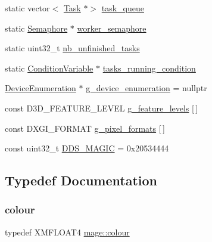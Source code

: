 \begin{DoxyCompactItemize}
\item 
static vector$<$ \hyperlink{classmage_1_1_task}{Task} $\ast$$>$ \hyperlink{namespacemage_a487c0bb81ed56ce18cd944e958961cdf}{task\+\_\+queue}
\item 
static \hyperlink{classmage_1_1_semaphore}{Semaphore} $\ast$ \hyperlink{namespacemage_a17c3448f9fba7521d188d30bdfb77e33}{worker\+\_\+semaphore}
\item 
static uint32\+\_\+t \hyperlink{namespacemage_a390e8652d67667609daf3aa64e3c00a8}{nb\+\_\+unfinished\+\_\+tasks}
\item 
static \hyperlink{classmage_1_1_condition_variable}{Condition\+Variable} $\ast$ \hyperlink{namespacemage_a8c04b4285ebbc0fb416b1905c01cf149}{tasks\+\_\+running\+\_\+condition}
\item 
\hyperlink{classmage_1_1_device_enumeration}{Device\+Enumeration} $\ast$ \hyperlink{namespacemage_a73e54b9b368875ed0281ced59e2fca7e}{g\+\_\+device\+\_\+enumeration} = nullptr
\item 
const D3\+D\+\_\+\+F\+E\+A\+T\+U\+R\+E\+\_\+\+L\+E\+V\+EL \hyperlink{namespacemage_add3b7e051df553262371e077d9d66fd9}{g\+\_\+feature\+\_\+levels} \mbox{[}$\,$\mbox{]}
\item 
const D\+X\+G\+I\+\_\+\+F\+O\+R\+M\+AT \hyperlink{namespacemage_a5a4e11b65061c618b85826ab6df480e0}{g\+\_\+pixel\+\_\+formats} \mbox{[}$\,$\mbox{]}
\item 
const uint32\+\_\+t \hyperlink{namespacemage_a52f784e41b51fee843891c6b5e9be479}{D\+D\+S\+\_\+\+M\+A\+G\+IC} = 0x20534444
\end{DoxyCompactItemize}


\subsection{Typedef Documentation}
\hypertarget{namespacemage_a2d4dece8fe175b32167f9a7b925adc7c}{}\label{namespacemage_a2d4dece8fe175b32167f9a7b925adc7c} 
\subsubsection{\texorpdfstring{colour}{colour}}
{\footnotesize\ttfamily typedef X\+M\+F\+L\+O\+A\+T4 \hyperlink{namespacemage_a2d4dece8fe175b32167f9a7b925adc7c}{mage\+::colour}}

\hypertarget{namespacemage_aab5dae4b0aaf8129b9e0d651d91d4b38}{}\label{namespacemage_aab5dae4b0aaf8129b9e0d651d91d4b38} 
